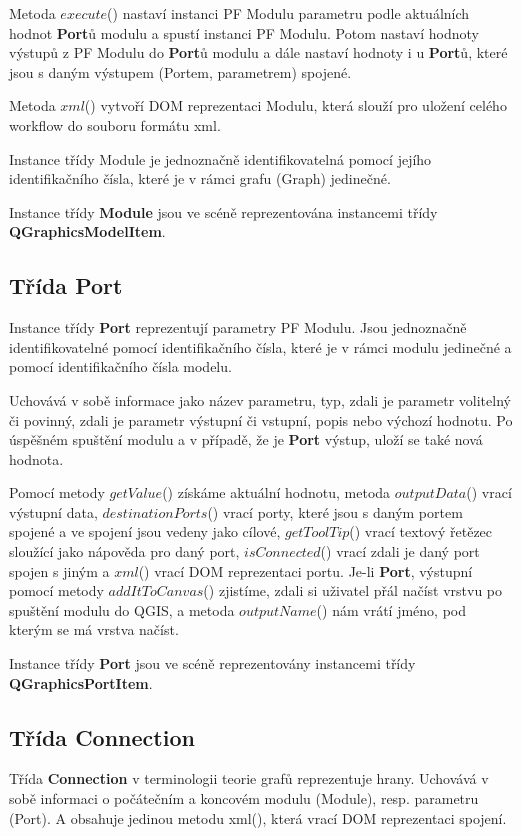 Metoda $execute$() nastaví instanci PF Modulu parametru podle aktuálních hodnot \textbf{Port}ů modulu a spustí instanci PF Modulu. Potom nastaví hodnoty výstupů z PF Modulu do \textbf{Port}ů modulu a dále nastaví hodnoty i u \textbf{Port}ů, které jsou s daným výstupem (Portem, parametrem) spojené. 

Metoda $xml$() vytvoří DOM reprezentaci Modulu, která slouží pro uložení celého workflow do souboru formátu xml.

Instance třídy Module je jednoznačně identifikovatelná pomocí jejího identifikačního čísla, které je v rámci grafu (Graph) jedinečné.

Instance třídy \textbf{Module} jsou ve scéně reprezentována instancemi třídy \textbf{QGraphicsModelItem}.

\subsection*{Třída Port}  
Instance třídy \textbf{Port} reprezentují parametry PF Modulu. Jsou jednoznačně identifikovatelné pomocí identifikačního čísla, které je v rámci modulu jedinečné a pomocí identifikačního čísla modelu.

Uchovává v sobě informace jako název parametru, typ, zdali je parametr volitelný či povinný, zdali je parametr výstupní či vstupní, popis nebo výchozí hodnotu. Po úspěšném spuštění modulu a v případě, že je \textbf{Port} výstup, uloží se také nová hodnota.

Pomocí metody $getValue$() získáme aktuální hodnotu, metoda $outputData$() vrací výstupní data, $destinationPorts$() vrací porty, které jsou s daným portem spojené a ve spojení jsou vedeny jako cílové, $getToolTip$() vrací textový řetězec sloužící jako nápověda pro daný port, $isConnected$() vrací zdali je daný port spojen s jiným a $xml$() vrací DOM reprezentaci portu. Je-li \textbf{Port}, výstupní pomocí metody $addItToCanvas$() zjistíme, zdali si uživatel přál načíst vrstvu po spuštění modulu do QGIS, a metoda $outputName$() nám vrátí jméno, pod kterým se má vrstva načíst.

Instance třídy \textbf{Port} jsou ve scéně reprezentovány instancemi třídy \textbf{QGraphicsPortItem}.

\subsection*{Třída Connection}
Třída \textbf{Connection} v terminologii teorie grafů reprezentuje hrany. Uchovává v sobě informaci o počátečním a koncovém modulu (Module), resp. parametru (Port). A obsahuje jedinou metodu xml(), která vrací DOM reprezentaci spojení.

